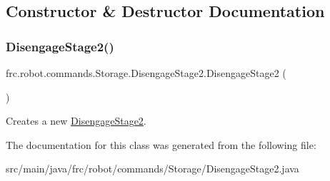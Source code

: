 \subsection{Constructor \& Destructor Documentation}
\mbox{\label{classfrc_1_1robot_1_1commands_1_1_storage_1_1_disengage_stage2_aa2184e21c1cdc76b99afcda89e44cde2}} 
\subsubsection{\texorpdfstring{DisengageStage2()}{DisengageStage2()}}
{\footnotesize\ttfamily frc.\+robot.\+commands.\+Storage.\+Disengage\+Stage2.\+Disengage\+Stage2 (\begin{DoxyParamCaption}{ }\end{DoxyParamCaption})\hspace{0.3cm}{\ttfamily [inline]}}

Creates a new \mbox{\hyperlink{classfrc_1_1robot_1_1commands_1_1_storage_1_1_disengage_stage2}{Disengage\+Stage2}}. 

The documentation for this class was generated from the following file\+:\begin{DoxyCompactItemize}
\item 
src/main/java/frc/robot/commands/\+Storage/Disengage\+Stage2.\+java\end{DoxyCompactItemize}
